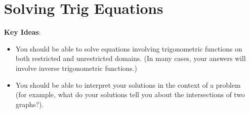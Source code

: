 \documentclass[main]{subfiles}
\begin{document}
\section{Solving Trig Equations} \label{ws3-4}

\begin{problemonly}
    \begin{framed}

\textbf{Key Ideas}:

\begin{itemize}[topsep=0pt,partopsep=0pt,parsep=8pt,itemsep=0pt]

\item You should be able to solve equations involving trigonometric
  functions on both restricted and unrestricted domains.  (In many cases,
  your answers will involve inverse trigonometric functions.) 

\item You should be able to interpret your solutions in the context of a
  problem (for example, what do your solutions tell you about the
  intersections of two graphs?).

\end{itemize}
\end{framed}
\end{problemonly}
\end{document}

